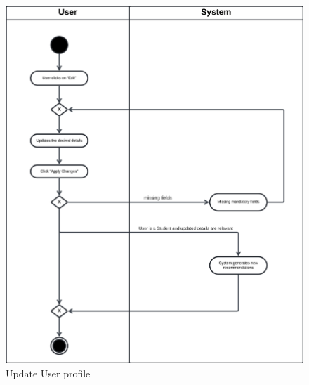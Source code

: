 \begin{figure}[H]
    \begin{center}
         \includegraphics[width=1\linewidth]{LaTeXCode/images/activity diagram/UC5.png}
         \caption{Update User profile}
         \label{fig:update_profile_ad}
     \end{center}
\end{figure}

\newpage

